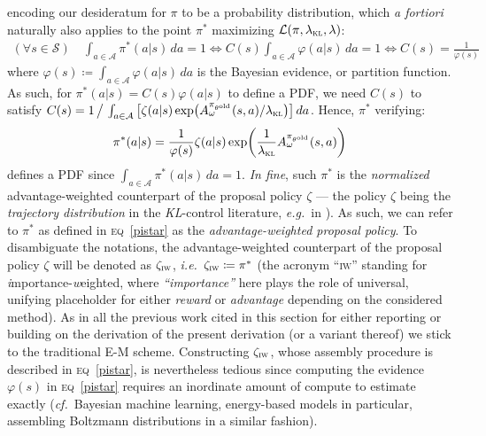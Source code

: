 encoding our desideratum for $\pi$ to be a probability distribution, which \textit{a fortiori}
naturally also applies to the point $\pi^*$ maximizing $\mathcal{L}(\pi, \lambda_\textsc{kl}, \lambda)$:
\begin{align}
  (\forall s \in \mathcal{S}) \quad
  \int_{a \in \mathcal{A}} \pi^*(a | s) \, da = 1
  \iff
  C(s) \int_{a \in \mathcal{A}} \varphi(a | s) \, da = 1
  \iff
  C(s) = \frac{1}{\varphi(s)}
\end{align}
where $\varphi(s) \coloneqq \int_{a \in \mathcal{A}} \varphi(a | s) \, da$ is the Bayesian evidence,
or partition function.
As such, for $\pi^*(a | s) = C(s) \varphi(a | s)$ to define a PDF,
we need $C(s)$ to satisfy $C(s) = 1 \, \big/ \, \int_{a \in \mathcal{A}}
\big[\zeta(a | s) \exp (A^{\pi_{\theta^\text{old}}}_\omega(s,a) / \lambda_\textsc{kl})\big] \, da$.
Hence, $\pi^*$ verifying:
\begin{align}
  \pi^*(a | s)
  = \frac{1}{\varphi(s)} \zeta(a | s) \exp (\frac{1}{\lambda_\textsc{kl}} A^{\pi_{\theta^\text{old}}}_\omega(s,a))
  \label{pistar}
\end{align}
defines a PDF since $\int_{a \in \mathcal{A}} \pi^*(a | s) \, da = 1$.
\textit{In fine}, such $\pi^*$ is the \emph{normalized} advantage-weighted counterpart of
the proposal policy $\zeta$
--- the policy $\zeta$ being the \textit{trajectory distribution} in the \textit{KL}-control literature,
\textit{e.g.}~in \cite{Peters2007-qb, Kober2010-hy, Peters2010-vd, Neumann2011-hn}).
As such, we can refer to $\pi^*$ as defined in \textsc{eq}~\ref{pistar} as the \emph{advantage-weighted
proposal policy}. To disambiguate the notations, the advantage-weighted counterpart of the
proposal policy $\zeta$ will be denoted as $\zeta_\textsc{iw}$, \textit{i.e.}~$\zeta_\textsc{iw} \coloneqq \pi^*$
(the acronym ``\textsc{iw}'' standing for \textit{i}mportance-\textit{w}eighted,
where \textit{``importance''} here plays the role of universal, unifying placeholder for either \textit{reward} or
\textit{advantage} depending on the considered method).
As in all the previous work cited in this section for either reporting or building on the derivation of the present
derivation (or a variant thereof) we stick to the traditional E-M scheme.
Constructing $\zeta_\textsc{iw}$, whose assembly procedure is described in \textsc{eq}~\ref{pistar},
is nevertheless tedious since computing the evidence $\varphi(s)$ in \textsc{eq}~\ref{pistar} requires
an inordinate amount of compute to estimate exactly (\textit{cf.}~Bayesian machine learning,
energy-based models in particular, assembling Boltzmann distributions in a similar fashion).

